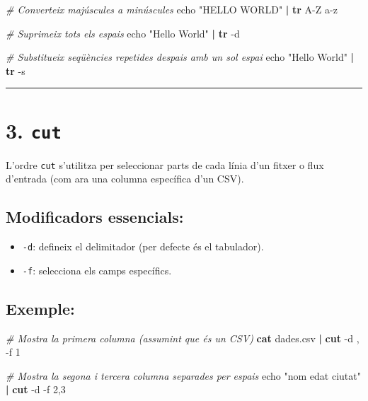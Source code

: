 \documentclass[
  12 pt,
  a4paper,
]{article}
\newenvironment{Shaded}{\begin{snugshade}}{\end{snugshade}}
\newcommand{\AttributeTok}[1]{\textcolor[rgb]{0.13,0.29,0.53}{#1}}
\newcommand{\BuiltInTok}[1]{#1}
\newcommand{\CommentTok}[1]{\textcolor[rgb]{0.56,0.35,0.01}{\textit{#1}}}
\newcommand{\FunctionTok}[1]{\textcolor[rgb]{0.13,0.29,0.53}{\textbf{#1}}}
\newcommand{\KeywordTok}[1]{\textcolor[rgb]{0.13,0.29,0.53}{\textbf{#1}}}
\newcommand{\NormalTok}[1]{#1}
\newcommand{\StringTok}[1]{\textcolor[rgb]{0.31,0.60,0.02}{#1}}
\providecommand{\tightlist}{%
  \setlength{\itemsep}{0pt}\setlength{\parskip}{0pt}}
\begin{document}
\begin{Shaded}
\begin{Highlighting}[]
\CommentTok{\# Converteix majúscules a minúscules}
\BuiltInTok{echo} \StringTok{"HELLO WORLD"} \KeywordTok{|} \FunctionTok{tr} \StringTok{\textquotesingle{}A{-}Z\textquotesingle{}} \StringTok{\textquotesingle{}a{-}z\textquotesingle{}}

\CommentTok{\# Suprimeix tots els espais}
\BuiltInTok{echo} \StringTok{"Hello   World"} \KeywordTok{|} \FunctionTok{tr} \AttributeTok{{-}d} \StringTok{\textquotesingle{} \textquotesingle{}}

\CommentTok{\# Substitueix seqüències repetides d\textquotesingle{}espais amb un sol espai}
\BuiltInTok{echo} \StringTok{"Hello      World"} \KeywordTok{|} \FunctionTok{tr} \AttributeTok{{-}s} \StringTok{\textquotesingle{} \textquotesingle{}}
\end{Highlighting}
\end{Shaded}

\begin{center}\rule{0.5\linewidth}{0.5pt}\end{center}

\section{\texorpdfstring{3. \texttt{cut}}{3. cut}}\label{cut}

L'ordre \texttt{cut} s'utilitza per seleccionar parts de cada línia d'un
fitxer o flux d'entrada (com ara una columna específica d'un CSV).

\subsection{Modificadors essencials:}\label{modificadors-essencials-2}

\begin{itemize}
\tightlist
\item
  \texttt{-d}: defineix el delimitador (per defecte és el tabulador).
\item
  \texttt{-f}: selecciona els camps específics.
\end{itemize}

\subsection{Exemple:}\label{exemple-2}

\begin{Shaded}
\begin{Highlighting}[]
\CommentTok{\# Mostra la primera columna (assumint que és un CSV)}
\FunctionTok{cat}\NormalTok{ dades.csv }\KeywordTok{|} \FunctionTok{cut} \AttributeTok{{-}d} \StringTok{\textquotesingle{},\textquotesingle{}} \AttributeTok{{-}f}\NormalTok{ 1}

\CommentTok{\# Mostra la segona i tercera columna separades per espais}
\BuiltInTok{echo} \StringTok{"nom edat ciutat"} \KeywordTok{|} \FunctionTok{cut} \AttributeTok{{-}d} \StringTok{\textquotesingle{} \textquotesingle{}} \AttributeTok{{-}f}\NormalTok{ 2,3}
\end{Highlighting}
\end{Shaded}
\end{document}
